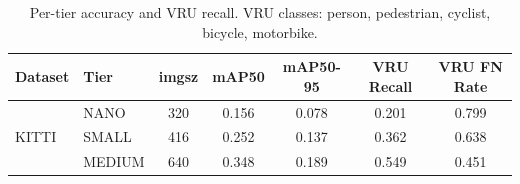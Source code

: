 \begin{table}[t]
\centering
\caption{Per-tier accuracy and VRU recall. VRU classes: person, pedestrian, cyclist, bicycle, motorbike.}
\label{tab:accuracy_per_tier}
\begin{tabular}{llccccc}
\toprule
Dataset & Tier & imgsz & mAP50 & mAP50-95 & VRU Recall & VRU FN Rate \\
\midrule
\multirow{3}{*}{KITTI} & NANO & 320 & 0.156 & 0.078 & 0.201 & 0.799 \\
 & SMALL & 416 & 0.252 & 0.137 & 0.362 & 0.638 \\
 & MEDIUM & 640 & 0.348 & 0.189 & 0.549 & 0.451 \\
\bottomrule
\end{tabular}
\end{table}